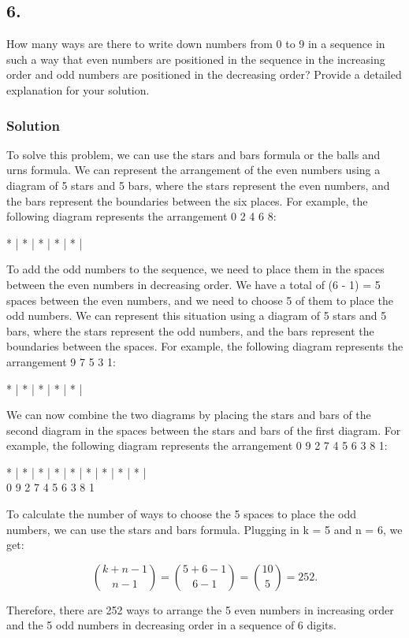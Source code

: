\documentclass[a4paper]{article}
\begin{document}
\subsection*{6. }
How many ways are there to write down numbers from 0 to 9 in a sequence in such a way that even numbers are positioned in the sequence in the increasing order and odd numbers are positioned in the decreasing order? Provide a detailed explanation for your solution.

\subsubsection*{Solution}

To solve this problem, we can use the stars and bars formula or the balls and urns formula. We can represent the arrangement of the even numbers using a diagram of 5 stars and 5 bars, where the stars represent the even numbers, and the bars represent the boundaries between the six places. For example, the following diagram represents the arrangement 0 2 4 6 8:
\begin{center}
* | * | * | * | * |
\end{center}
To add the odd numbers to the sequence, we need to place them in the spaces between the even numbers in decreasing order. We have a total of (6 - 1) = 5 spaces between the even numbers, and we need to choose 5 of them to place the odd numbers. We can represent this situation using a diagram of 5 stars and 5 bars, where the stars represent the odd numbers, and the bars represent the boundaries between the spaces. For example, the following diagram represents the arrangement 9 7 5 3 1:
\begin{center}
* | * | * | * | * |    
\end{center}
We can now combine the two diagrams by placing the stars and bars of the second diagram in the spaces between the stars and bars of the first diagram. For example, the following diagram represents the arrangement 0 9 2 7 4 5 6 3 8 1:
\begin{center}
* | * | * | * | * | * | * | * | * | \\
0 9 2 7 4 5 6 3 8 1    
\end{center}
To calculate the number of ways to choose the 5 spaces to place the odd numbers, we can use the stars and bars formula. Plugging in k = 5 and n = 6, we get:

\[\binom{k+n-1}{n-1} = \binom{5+6-1}{6-1} = \binom{10}{5} = 252.\]

Therefore, there are 252 ways to arrange the 5 even numbers in increasing order and the 5 odd numbers in decreasing order in a sequence of 6 digits.
\end{document}
